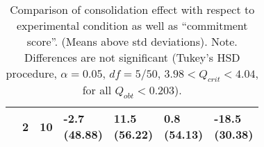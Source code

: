 \begin{table*}
\begin{tabularx}{\textwidth}{XXXXXXX}
      &
      2
      &
      10
      & \cellcontent{-2.7\\(48.88)}
      & \cellcontent{11.5\\(56.22)}
      & \cellcontent{0.8\\(54.13)}
      & \cellcontent{-18.5\\(30.38)}
      \\

      \bottomrule
    \end{tabularx}
    \endgroup
  \caption{Comparison of consolidation effect with respect to
    experimental condition as well as ``commitment score''. (Means
    above std deviations). Note. Differences are not significant
    (Tukey's HSD procedure, $\alpha=0.05$, $df = 5/50$,  $3.98 <
    Q_{crit} < 4.04$, for all $Q_{obt}<0.203$).\label{tab:commitment}}
\end{table*}



